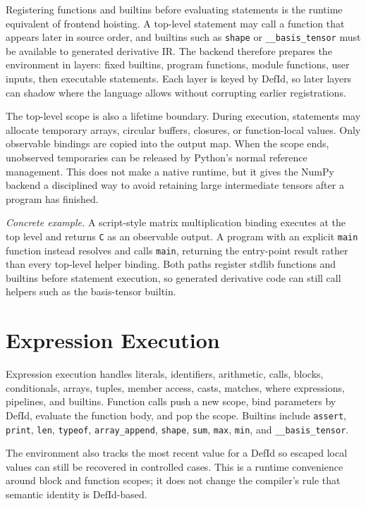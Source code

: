 Registering functions and builtins before evaluating statements is the runtime
equivalent of frontend hoisting. A top-level statement may call a function that
appears later in source order, and builtins such as \texttt{shape} or
\texttt{\_\_basis\_tensor} must be available to generated derivative IR. The
backend therefore prepares the environment in layers: fixed builtins, program
functions, module functions, user inputs, then executable statements. Each
layer is keyed by DefId, so later layers can shadow where the language allows
without corrupting earlier registrations.

The top-level scope is also a lifetime boundary. During execution, statements
may allocate temporary arrays, circular buffers, closures, or function-local
values. Only observable bindings are copied into the output map. When the scope
ends, unobserved temporaries can be released by Python's normal reference
management. This does not make \einlang{} a native runtime, but it gives the
NumPy backend a disciplined way to avoid retaining large intermediate tensors
after a program has finished.

\textit{Concrete example.} A script-style matrix multiplication binding
executes at the top level and returns \texttt{C} as an observable output. A
program with an explicit \texttt{main} function instead resolves and calls
\texttt{main}, returning the entry-point result rather than every top-level
helper binding. Both paths register stdlib functions and builtins before
statement execution, so generated derivative code can still call helpers such
as the basis-tensor builtin.

\section{Expression Execution}

Expression execution handles literals, identifiers, arithmetic, calls, blocks,
conditionals, arrays, tuples, member access, casts, matches, where expressions,
pipelines, and builtins. Function calls push a new scope, bind parameters by
DefId, evaluate the function body, and pop the scope. Builtins include
\texttt{assert}, \texttt{print}, \texttt{len}, \texttt{typeof},
\texttt{array\_append}, \texttt{shape}, \texttt{sum}, \texttt{max},
\texttt{min}, and \texttt{\_\_basis\_tensor}.

The environment also tracks the most recent value for a DefId so escaped local
values can still be recovered in controlled cases. This is a runtime convenience
around block and function scopes; it does not change the compiler's rule that
semantic identity is DefId-based.


